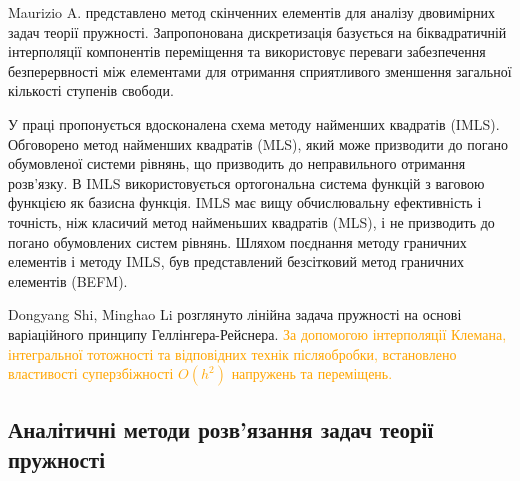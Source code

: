 Maurizio A. \cite{maurizio_1} представлено метод скінченних елементів для аналізу двовимірних задач теорії пружності.
Запропонована дискретизація базується на біквадратичній інтерполяції компонентів переміщення та
використовує переваги забезпечення безперервності між елементами для отримання сприятливого зменшення загальної кількості ступенів свободи.

У праці \cite{liew_1} пропонується вдосконалена схема методу найменших квадратів (IMLS).
Обговорено метод найменших квадратів (MLS), який може призводити до погано обумовленої системи рівнянь,
що призводить до неправильного отримання розв'язку.
В IMLS використовується ортогональна система функцій з ваговою функцією як базисна функція.
IMLS має вищу обчислювальну ефективність і точність, ніж класичий метод найменьших квадратів (MLS),
і не призводить до погано обумовлених систем рівнянь.
Шляхом поєднання методу граничних елементів і методу IMLS, був представлений безсітковий метод граничних елементів (BEFM).

Dongyang Shi, Minghao Li \cite{dong_1} розглянуто лінійна задача пружності на основі варіаційного принципу Геллінгера-Рейснера.
\textcolor{orange}{За допомогою інтерполяції Клемана, інтегральної тотожності та відповідних технік післяобробки,
встановлено властивості суперзбіжності $O(h^2)$ напружень та переміщень.}




\subsection{Аналітичні методи розв'язання задач теорії пружності}